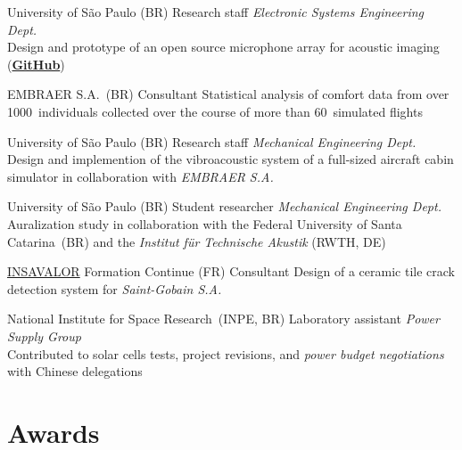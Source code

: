 \documentclass[highlights,publist]{cvlfoc}
\begin{document}
\begin{entrydate}
		{University of S\~{a}o Paulo (BR)}
		{Research staff}
		{\textit{Electronic Systems Engineering Dept.}
		\\
		Design and prototype of an open source microphone array for acoustic
		imaging\\(\href{https://github.com/lfochamon/memsarray}{\textbf{GitHub}})}

		{EMBRAER S.A.\ (BR)}
		{Consultant}
		{Statistical analysis of comfort data from over 1000~individuals
		collected over the course of more than 60~simulated flights}

		{University of S\~{a}o Paulo (BR)}
		{Research staff}
		{\textit{Mechanical Engineering Dept.}
		\\
		Design and implemention of the vibroacoustic system of
		a full-sized aircraft cabin simulator in collaboration with \emph{EMBRAER S.A.}}

		{University of S\~{a}o Paulo (BR)}
		{Student researcher}
		{\textit{Mechanical Engineering Dept.}
		\\
		Auralization study in collaboration with the Federal University of Santa Catarina~(BR) and the \textit{Institut für Technische Akustik}
		(RWTH, DE)}

		{\href{https://www.insavalor.fr}{INSAVALOR} Formation Continue (FR)}
		{Consultant}
		{Design of a ceramic tile crack detection system for \emph{Saint-Gobain S.A.}}

		{National Institute for Space Research~(INPE, BR)}
		{Laboratory assistant}
		{\textit{Power Supply Group}
		\\
		Contributed to solar cells tests, project revisions, and
		\emph{power budget negotiations} with Chinese delegations}
\end{entrydate}



\section*{Awards}
\end{document}
